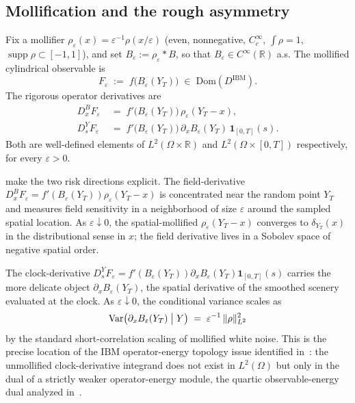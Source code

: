 \documentclass[11pt,reqno]{amsart}
\theoremstyle{plain}
\theoremstyle{definition}
\theoremstyle{remark}
\newcommand{\R}{\mathbb R}
\newcommand{\Bvar}{B}
\newcommand{\Yclock}{Y}
\DeclareMathOperator{\supp}{supp}
\DeclareMathOperator{\Var}{Var}
\begin{document}
\subsection{Mollification and the rough asymmetry}\label{sec:mollified}

Fix a mollifier
$\rho_{\varepsilon}(x)=\varepsilon^{-1}\rho(x/\varepsilon)$
(even, nonnegative, $C_{c}^{\infty}$, $\int\rho=1$,
$\supp\rho\subset[-1,1]$), and set
$\Bvar_{\varepsilon}:=\rho_{\varepsilon}*\Bvar$, so that
$\Bvar_{\varepsilon}\in C^{\infty}(\R)$ a.s. The mollified
cylindrical observable is
\begin{equation}\label{eq:F-eps}
  F_{\varepsilon}\;:=\;f\bigl(\Bvar_{\varepsilon}(\Yclock_{T})\bigr)\;\in\;\mathrm{Dom}(D^{\mathrm{IBM}}).
\end{equation}
The rigorous operator derivatives are
\begin{align}
  D^{\Bvar}_{x}F_{\varepsilon}
  &\;=\;f'\bigl(\Bvar_{\varepsilon}(\Yclock_{T})\bigr)\,\rho_{\varepsilon}(\Yclock_{T}-x),
   \label{eq:DB-eps}\\
  D^{\Yclock}_{s}F_{\varepsilon}
  &\;=\;f'\bigl(\Bvar_{\varepsilon}(\Yclock_{T})\bigr)\,\partial_{x}\Bvar_{\varepsilon}(\Yclock_{T})\,\mathbf 1_{[0,T]}(s).
   \label{eq:DY-eps}
\end{align}
Both are well-defined elements of $L^{2}(\Omega\times\R)$ and
$L^{2}(\Omega\times[0,T])$ respectively, for every
$\varepsilon>0$.

 make the two risk directions
explicit. The field-derivative
$D^{\Bvar}_{x}F_{\varepsilon}=f'(\Bvar_{\varepsilon}(\Yclock_{T}))\rho_{\varepsilon}(\Yclock_{T}-x)$
is concentrated near the random point $\Yclock_{T}$ and
measures field sensitivity in a neighborhood of size
$\varepsilon$ around the sampled spatial location. As
$\varepsilon\downarrow 0$, the spatial-mollified
$\rho_{\varepsilon}(\Yclock_{T}-x)$ converges to
$\delta_{\Yclock_{T}}(x)$ in the distributional sense in $x$;
the field derivative lives in a Sobolev space of negative
spatial order.

The clock-derivative
$D^{\Yclock}_{s}F_{\varepsilon}=f'(\Bvar_{\varepsilon}(\Yclock_{T}))\partial_{x}\Bvar_{\varepsilon}(\Yclock_{T})\mathbf 1_{[0,T]}(s)$
carries the more delicate object
$\partial_{x}\Bvar_{\varepsilon}(\Yclock_{T})$, the spatial
derivative of the smoothed scenery evaluated at the clock. As
$\varepsilon\downarrow 0$, the conditional variance scales as
\begin{equation}\label{eq:clock-var-scaling}
  \Var\bigl(\partial_{x}\Bvar_{\varepsilon}(\Yclock_{T})\bigm|\Yclock\bigr)
   \;=\;\varepsilon^{-1}\,\|\rho\|^{2}_{L^{2}}
\end{equation}
by the standard short-correlation scaling of mollified white
noise. This is the precise location of the IBM operator-energy
topology issue identified in~\cite[\S 5--6]{EnergyFirst}: the
unmollified clock-derivative integrand does not exist in
$L^{2}(\Omega)$ but only in the dual of a strictly weaker
operator-energy module, the quartic observable-energy dual
analyzed in~\cite{EnergyFirst,FCDC,BidegreeAtlas}.
\end{document}
